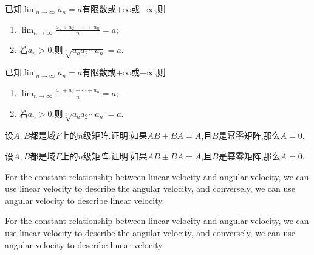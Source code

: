    \begin{anymark}[注解~证明极限存在性常用二法]{}
    已知$\lim_{n\to\infty}a_n=a$\;有限数或$+\infty$或$-\infty$,则
    \begin{enumerate}
        \item $\lim_{n\to\infty}\frac{a_1+a_2+\cdots+a_n}{n}=a$;
        \item 若$a_n>0$,则$\sqrt[n]{a_a a_2 \cdots a_n}=a$.
    \end{enumerate}
\end{anymark}

\begin{tcblisting}{}
\begin{anymark}[注解~证明极限存在性常用二法]{}
已知$\lim_{n\to\infty}a_n=a$\;有限数或$+\infty$或$-\infty$,则
\begin{enumerate}
    \item $\lim_{n\to\infty}\frac{a_1+a_2+\cdots+a_n}{n}=a$;
    \item 若$a_n>0$,则$\sqrt[n]{a_a a_2 \cdots a_n}=a$.
\end{enumerate}
\end{anymark}
\end{tcblisting}

\begin{mybox1}
    设$A,B$都是域$F$上的$n$级矩阵.证明:如果$AB\pm BA=A$,且$B$是幂零矩阵,那么$A=0$.
\end{mybox1}
\begin{tcblisting}{}
\begin{mybox1}
    设$A,B$都是域$F$上的$n$级矩阵.证明:如果$AB\pm BA=A$,且$B$是幂零矩阵,那么$A=0$.
\end{mybox1}
\end{tcblisting}

\begin{marker}
    For the constant relationship between linear velocity and angular velocity, we can use linear velocity to describe the angular velocity, and conversely, we can use angular velocity to describe linear velocity.
\end{marker}

\begin{tcblisting}{}
\begin{marker}
    For the constant relationship between linear velocity and angular velocity, we can use linear velocity to describe the angular velocity, and conversely, we can use angular velocity to describe linear velocity.
\end{marker}
\end{tcblisting}


